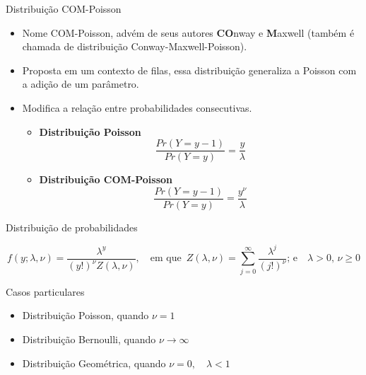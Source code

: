 \documentclass[10pt, aspectratio=169]{beamer}\usepackage[]{graphicx}\usepackage[]{color}
\begin{document}
\begin{frame}[allowframebreaks]{Distribuição COM-Poisson}

\begin{itemize}
    \item Nome COM-Poisson, advém de seus autores {\bf CO}nway e
    {\bf M}axwell (também é chamada de distribuição
    Conway-Maxwell-Poisson).
    \item Proposta em um contexto de filas,
    essa distribuição generaliza a Poisson com a adição de um parâmetro.
    \item Modifica a relação entre probabilidades consecutivas.
    \begin{multicols}{2}
        \begin{itemize}
            \item {\bf Distribuição Poisson}\\
            $$\frac{Pr(Y = y-1)}{Pr(Y = y)} = \frac{y}{\lambda}$$
            \item {\bf Distribuição COM-Poisson}\\
            $$\frac{Pr(Y = y-1)}{Pr(Y = y)} = \frac{y^\nu}{\lambda}$$
        \end{itemize}
    \end{multicols}   
\end{itemize}

\framebreak

\begin{block}{Distribuição de probabilidades}
\begin{center}
\begin{equation*} 
    f(y; \lambda, \nu) = \frac{\lambda^y}{(y!)^\nu 
    Z(\lambda, \nu)}, \quad \textrm{em que }\, Z(\lambda, \nu) = 
    \sum_{j=0}^\infty \frac{\lambda^j}{(j!)^\nu} \textrm{; e}\quad
    \lambda > 0, \, \nu \geq 0
\end{equation*}
\end{center}
\end{block}

\begin{block}{Casos particulares}
\begin{itemize}
	\item Distribuição Poisson, quando $\nu = 1$
	\item Distribuição Bernoulli, quando $\nu \rightarrow \infty$
	\item Distribuição Geométrica, quando $\nu = 0, \quad \lambda < 1$
\end{itemize}
\end{block}
\end{frame}
\end{document}
